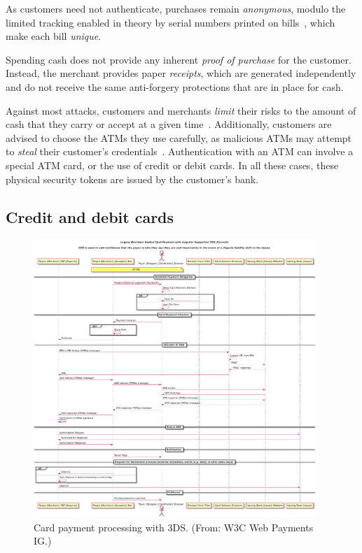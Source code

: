 \documentclass{llncs}
\begin{document}
As customers need not authenticate, purchases remain {\em
  anonymous}, modulo the limited tracking enabled in theory
by serial numbers printed on bills~\cite{pets2004kuegler},
which make each bill {\em unique}.

Spending cash does not provide any inherent {\em proof of purchase}
for the customer. Instead, the merchant provides paper
{\em receipts}, which are generated independently and do not receive
the same anti-forgery protections that are in place for cash.

Against most attacks, customers and merchants {\em limit} their risks
to the amount of cash that they carry or accept at a given
time~\cite{Bankrate}.  Additionally, customers are advised to choose
the ATMs they use carefully, as malicious ATMs may attempt to
{\em steal} their customer's credentials~\cite{ECB:TRoCF2014}.  Authentication with an
ATM can involve a special ATM card, or the use of credit or
debit cards.  In all these cases, these physical security tokens are
issued by the customer's bank.


\subsection{Credit and debit cards}

\begin{figure}[h!]
\begin{center}
\includegraphics[width=0.95\textwidth]{figs/cc3ds.pdf}
\end{center}
\caption{Card payment processing with 3DS. (From: W3C Web Payments IG.)}
\label{fig:cc3ds}
\end{figure}
\end{document}
